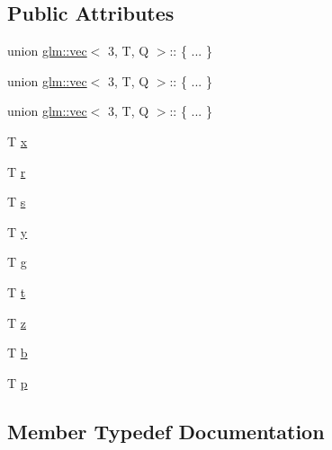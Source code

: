 \subsection*{Public Attributes}
\begin{DoxyCompactItemize}
\item 
union \mbox{\hyperlink{structglm_1_1vec}{glm\+::vec}}$<$ 3, T, Q $>$\+:: \{ ... \}  
\item 
union \mbox{\hyperlink{structglm_1_1vec}{glm\+::vec}}$<$ 3, T, Q $>$\+:: \{ ... \}  
\item 
union \mbox{\hyperlink{structglm_1_1vec}{glm\+::vec}}$<$ 3, T, Q $>$\+:: \{ ... \}  
\item 
T \mbox{\hyperlink{structglm_1_1vec_3_013_00_01_t_00_01_q_01_4_aa124b422bca85bd1e079c5880591d056}{x}}
\item 
T \mbox{\hyperlink{structglm_1_1vec_3_013_00_01_t_00_01_q_01_4_a7c3057b389465e2d02536d22ae2c1110}{r}}
\item 
T \mbox{\hyperlink{structglm_1_1vec_3_013_00_01_t_00_01_q_01_4_ab09b6a68cfa21e42185cd4aff2a7c55e}{s}}
\item 
T \mbox{\hyperlink{structglm_1_1vec_3_013_00_01_t_00_01_q_01_4_a3ff0c9672e374f78b7403d0c04ddc329}{y}}
\item 
T \mbox{\hyperlink{structglm_1_1vec_3_013_00_01_t_00_01_q_01_4_aa01fb9a90b9b739797a0f1ca96206570}{g}}
\item 
T \mbox{\hyperlink{structglm_1_1vec_3_013_00_01_t_00_01_q_01_4_ab7239400a0533eada559b15c3361dc3c}{t}}
\item 
T \mbox{\hyperlink{structglm_1_1vec_3_013_00_01_t_00_01_q_01_4_a33809116048db7caf55162a670dec598}{z}}
\item 
T \mbox{\hyperlink{structglm_1_1vec_3_013_00_01_t_00_01_q_01_4_a3bec3aae8fdbe58bc4a6354285609050}{b}}
\item 
T \mbox{\hyperlink{structglm_1_1vec_3_013_00_01_t_00_01_q_01_4_acc882ded9421aad1b65564cde0ca1411}{p}}
\end{DoxyCompactItemize}


\subsection{Member Typedef Documentation}
\mbox{\label{structglm_1_1vec_3_013_00_01_t_00_01_q_01_4_a8574623d0fe3b330e18c10b8d5022ca6}} 
